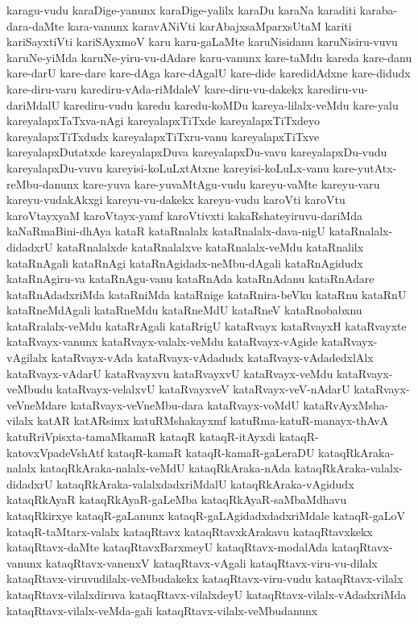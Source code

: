 {karagu-vudu
karaDige-yanunx
karaDige-yalilx
karaDu
karaNa
karaditi
karaba-dara-daMte
kara-vanunx
karavANiVti
karAbajxsaMparxsUtaM
kariti
kariSayxtiVti
kariSAyxmoV
karu
karu-gaLaMte
karuNisidanu
karuNisiru-vuvu
karuNe-yiMda
karuNe-yiru-vu-dAdare
karu-vanunx
kare-taMdu
kareda
kare-danu
kare-darU
kare-dare
kare-dAga
kare-dAgalU
kare-dide
karedidAdxne
kare-didudx
kare-diru-varu
karediru-vAda-riMdaleV
kare-diru-vu-dakekx
karediru-vu-dariMdalU
karediru-vudu
karedu
karedu-koMDu
kareya-lilalx-veMdu
kare-yalu
kareyalapxTaTxva-nAgi
kareyalapxTiTxde
kareyalapxTiTxdeyo
kareyalapxTiTxdudx
kareyalapxTiTxru-vanu
kareyalapxTiTxve
kareyalapxDutatxde
kareyalapxDuva
kareyalapxDu-vavu
kareyalapxDu-vudu
kareyalapxDu-vuvu
kareyisi-koLuLxtAtxne
kareyisi-koLuLx-vanu
kare-yutAtx-reMbu-danunx
kare-yuva
kare-yuvaMtAgu-vudu
kareyu-vaMte
kareyu-varu
kareyu-vudakAkxgi
kareyu-vu-dakekx
kareyu-vudu
karoVti
karoVtu
karoVtayxyaM
karoVtayx-yamf
karoVtivxti
kakaRshateyiruvu-dariMda
kaNaRmaBini-dhAya
kataR
kataRnalalx
kataRnalalx-dava-nigU
kataRnalalx-didadxrU
kataRnalalxde
kataRnalalxve
kataRnalalx-veMdu
kataRnalilx
kataRnAgali
kataRnAgi
kataRnAgidadx-neMbu-dAgali
kataRnAgidudx
kataRnAgiru-va
kataRnAgu-vanu
kataRnAda
kataRnAdanu
kataRnAdare
kataRnAdadxriMda
kataRniMda
kataRnige
kataRnira-beVku
kataRnu
kataRnU
kataRneMdAgali
kataRneMdu
kataRneMdU
kataRneV
kataRnobabxnu
kataRralalx-veMdu
kataRrAgali
kataRrigU
kataRvayx
kataRvayxH
kataRvayxte
kataRvayx-vanunx
kataRvayx-valalx-veMdu
kataRvayx-vAgide
kataRvayx-vAgilalx
kataRvayx-vAda
kataRvayx-vAdadudx
kataRvayx-vAdadedxlAlx
kataRvayx-vAdarU
kataRvayxvu
kataRvayxvU
kataRvayx-veMdu
kataRvayx-veMbudu
kataRvayx-velalxvU
kataRvayxveV
kataRvayx-veV-nAdarU
kataRvayx-veVneMdare
kataRvayx-veVneMbu-dara
kataRvayx-voMdU
kataRvAyxMsha-vilalx
katAR
katARsimx
katuRMshakayxmf
katuRma-katuR-manayx-thAvA
katuRriVpisxta-tamaMkamaR
kataqR
kataqR-itAyxdi
kataqR-katovxVpadeVshAtf
kataqR-kamaR
kataqR-kamaR-gaLeraDU
kataqRkAraka-nalalx
kataqRkAraka-nalalx-veMdU
kataqRkAraka-nAda
kataqRkAraka-valalx-didadxrU
kataqRkAraka-valalxdadxriMdalU
kataqRkAraka-vAgidudx
kataqRkAyaR
kataqRkAyaR-gaLeMba
kataqRkAyaR-saMbaMdhavu
kataqRkirxye
kataqR-gaLanunx
kataqR-gaLAgidadxdadxriMdale
kataqR-gaLoV
kataqR-taMtarx-valalx
kataqRtavx
kataqRtavxkArakavu
kataqRtavxkekx
kataqRtavx-daMte
kataqRtavxBarxmeyU
kataqRtavx-modalAda
kataqRtavx-vanunx
kataqRtavx-vanenxV
kataqRtavx-vAgali
kataqRtavx-viru-vu-dilalx
kataqRtavx-viruvudilalx-veMbudakekx
kataqRtavx-viru-vudu
kataqRtavx-vilalx
kataqRtavx-vilalxdiruva
kataqRtavx-vilalxdeyU
kataqRtavx-vilalx-vAdadxriMda
kataqRtavx-vilalx-veMda-gali
kataqRtavx-vilalx-veMbudanunx
}

